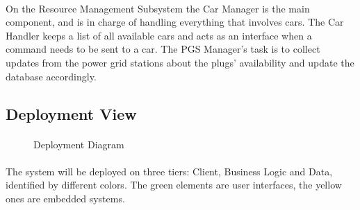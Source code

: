 \documentclass[english]{article}
\begin{document}
\paragraph{}
On the Resource Management Subsystem the Car Manager is the main component, and is in charge of handling everything that involves cars. The Car Handler keeps a list of all available cars and acts as an interface when a command needs to be sent to a car.
The PGS Manager's task is to collect updates from the power grid stations about the plugs' availability and update the database accordingly.

\newpage
\subsection{Deployment View}

\paragraph{}

\begin{figure}[H]
	\centering
	\caption{Deployment Diagram}
	\label{deploymentdiagram}
\end{figure}

\paragraph{}
The system will be deployed on three tiers: Client, Business Logic and Data, identified by different colors. The green elements are user interfaces, the yellow ones are embedded systems.
\end{document}
